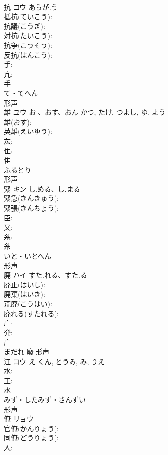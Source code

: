\documentclass[8pt]{extreport}
\begin{document}
\begin{CJK}{UTF8}{min}
\\	抗	コウ	あらが.う		
\\	抵抗(ていこう): 
\\	抗議(こうぎ): 
\\	対抗(たいこう): 
\\	抗争(こうそう): 
\\	反抗(はんこう): 
\\	手: 
\\	亢: 
\\	手	
\\	て・てへん	
\\	形声 
\\	雄	ユウ	お-、おす、おん	かつ, たけ, つよし, ゆ, よう	
\\	雄(おす): 
\\	英雄(えいゆう): 
\\	厷: 
\\	隹: 
\\	隹	
\\	ふるとり	
\\	形声 
\\	緊	キン	し.める、し.まる		
\\	緊急(きんきゅう): 
\\	緊張(きんちょう): 
\\	臣: 
\\	又: 
\\	糸: 
\\	糸	
\\	いと・いとへん	
\\	形声 
\\	廃	ハイ	すた.れる、すた.る		
\\	廃止(はいし): 
\\	廃棄(はいき): 
\\	荒廃(こうはい): 
\\	廃れる(すたれる): 
\\	广: 
\\	発: 
\\	广	
\\	まだれ	廢	形声 
\\	江	コウ	え	くん, とうみ, み, りえ	
\\	水: 
\\	工: 
\\	水	
\\	みず・したみず・さんずい	
\\	形声 
\\	僚	リョウ			
\\	官僚(かんりょう): 
\\	同僚(どうりょう): 
\\	人: 

\end{CJK}
\end{document}
